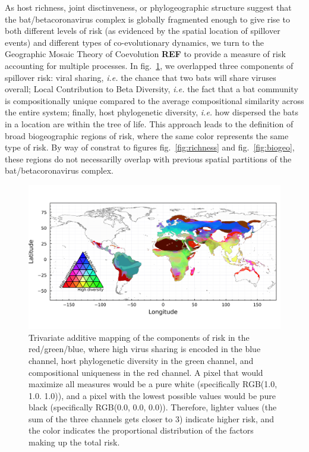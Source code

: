 \documentclass[11pt]{article}
\makeatletter
\def\maxwidth{\ifdim\Gin@nat@width>\linewidth\linewidth
\else\Gin@nat@width\fi}
\let\Oldincludegraphics\includegraphics
\renewcommand{\includegraphics}[1]{\Oldincludegraphics[width=\maxwidth]{#1}}
\makeatother
\begin{document}
As host richness, joint disctinveness, or phylogeographic structure
suggest that the bat/betacoronavirus complex is globally fragmented
enough to give rise to both different levels of risk (as evidenced by
the spatial location of spillover events) and different types of
co-evolutionary dynamics, we turn to the Geographic Mosaic Theory of
Coevolution \textbf{REF} to provide a measure of risk accounting for
multiple processes. In fig.~\ref{fig:trivariate}, we overlapped three
components of spillover risk: viral sharing, \emph{i.e.} the chance that
two bats will share viruses overall; Local Contribution to Beta
Diversity, \emph{i.e.} the fact that a bat community is compositionally
unique compared to the average compositional similarity across the
entire system; finally, host phylogenetic diversity, \emph{i.e.} how
dispersed the bats in a location are within the tree of life. This
approach leads to the definition of broad biogeographic regions of risk,
where the same color represents the same type of risk. By way of
constrat to figures fig.~\ref{fig:richness} and fig.~\ref{fig:biogeo},
these regions do not necessarilly overlap with previous spatial
partitions of the bat/betacoronavirus complex.

\begin{figure}
\hypertarget{fig:trivariate}{%
\centering
\includegraphics{figures/risk_trivariate.png}
\caption{Trivariate additive mapping of the components of risk in the
red/green/blue, where high virus sharing is encoded in the blue channel,
host phylogenetic diversity in the green channel, and compositional
uniqueness in the red channel. A pixel that would maximize all measures
would be a pure white (specifically RGB(1.0, 1.0. 1.0)), and a pixel
with the lowest possible values would be pure black (specifically
RGB(0.0, 0.0, 0.0)). Therefore, lighter values (the sum of the three
channels gets closer to 3) indicate higher risk, and the color indicates
the proportional distribution of the factors making up the total
risk.}\label{fig:trivariate}
}
\end{figure}
\end{document}
